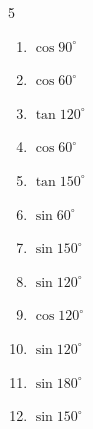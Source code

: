 \begin{multicols}{5}
\begin{enumerate}
        \phantom{$\displaystyle =0$}

\columnbreak %

  \item $\displaystyle \cos{90^\circ}$

        \phantom{$\displaystyle =0$}

  \item $\displaystyle \cos{60^\circ}$


  \item $\displaystyle \tan{120^\circ}$


  \item $\displaystyle \cos{60^\circ}$


  \item $\displaystyle \tan{150^\circ}$


  \item $\displaystyle \sin{60^\circ}$


  \item $\displaystyle \sin{150^\circ}$


  \item $\displaystyle \sin{120^\circ}$


  \item $\displaystyle \cos{120^\circ}$


  \item $\displaystyle \sin{120^\circ}$


  \item $\displaystyle \sin{180^\circ}$

        \phantom{$\displaystyle =0$}

  \item $\displaystyle \sin{150^\circ}$



\end{enumerate}
\end{multicols}

